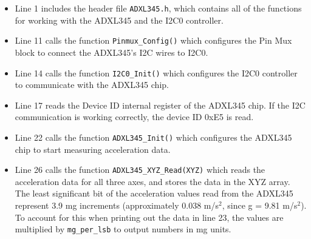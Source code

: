 \documentclass[11pt, twoside, pdftex]{article}
\newcommand{\commonPath}{../../Common}
\begin{document}
\begin{itemize} \itemsep0.5pt
\item Line 1 includes the header file \texttt{ADXL345.h}, which contains all of the functions for working with the ADXL345 and the I2C0 controller. 
\item Line 11 calls the function \texttt{Pinmux\_Config()} which configures the Pin Mux block to connect the ADXL345's I2C wires to I2C0.
\item Line 14 calls the function \texttt{I2C0\_Init()} which configures the I2C0 controller to communicate with the ADXL345 chip. 
\item Line 17 reads the Device ID internal register of the ADXL345 chip. If the I2C communication is working correctly, the device ID 0xE5 is read.
\item Line 22 calls the function \texttt{ADXL345\_Init()} which configures the ADXL345 chip to start measuring acceleration data.
\item Line 26 calls the function \texttt{ADXL345\_XYZ\_Read(XYZ)} which reads the acceleration data for all three axes, and stores the data in the XYZ array. The least significant bit of the acceleration values read from the ADXL345 represent 3.9 mg increments (approximately 0.038 m/s$^2$, since g = 9.81 m/s$^2$). To account for this when printing out the data in line 23, the values are multiplied by \texttt{mg\_per\_lsb} to output numbers in mg units. 
\end{itemize}





\end{document}
